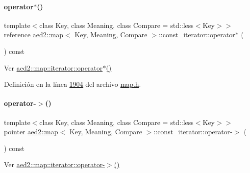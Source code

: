 \paragraph{\texorpdfstring{operator$\ast$()}{operator*()}}
{\footnotesize\ttfamily template$<$class Key, class Meaning, class Compare = std\+::less$<$\+Key$>$$>$ \\
reference \hyperlink{classaed2_1_1map}{aed2\+::map}$<$ Key, Meaning, Compare $>$\+::const\+\_\+iterator\+::operator$\ast$ (\begin{DoxyParamCaption}{ }\end{DoxyParamCaption}) const\hspace{0.3cm}{\ttfamily [inline]}}



Ver \hyperlink{classaed2_1_1map_1_1iterator_ab115711d0295146906830840590d900a_ab115711d0295146906830840590d900a}{aed2\+::map\+::iterator\+::operator$\ast$()} 



Definición en la línea \hyperlink{map_8h_source_l01904}{1904} del archivo \hyperlink{map_8h_source}{map.\+h}.

\mbox{\label{classaed2_1_1map_1_1const__iterator_a07700cccc763da67d42c84d20f4e1d1b_a07700cccc763da67d42c84d20f4e1d1b}} 
\paragraph{\texorpdfstring{operator-\/$>$()}{operator->()}}
{\footnotesize\ttfamily template$<$class Key, class Meaning, class Compare = std\+::less$<$\+Key$>$$>$ \\
pointer \hyperlink{classaed2_1_1map}{aed2\+::map}$<$ Key, Meaning, Compare $>$\+::const\+\_\+iterator\+::operator-\/$>$ (\begin{DoxyParamCaption}{ }\end{DoxyParamCaption}) const\hspace{0.3cm}{\ttfamily [inline]}}



Ver \hyperlink{classaed2_1_1map_1_1iterator_a712522d62f461c1eb9b02ecf248bae8c_a712522d62f461c1eb9b02ecf248bae8c}{aed2\+::map\+::iterator\+::operator-\/$>$()} 



